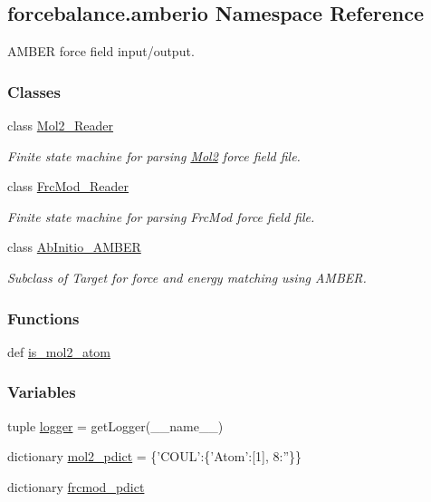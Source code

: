 \hypertarget{namespaceforcebalance_1_1amberio}{\subsection{forcebalance.\-amberio Namespace Reference}
\label{namespaceforcebalance_1_1amberio}
}


A\-M\-B\-E\-R force field input/output.  


\subsubsection*{Classes}
\begin{DoxyCompactItemize}
\item 
class \hyperlink{classforcebalance_1_1amberio_1_1Mol2__Reader}{Mol2\-\_\-\-Reader}
\begin{DoxyCompactList}\small\item\em Finite state machine for parsing \hyperlink{namespaceforcebalance_1_1Mol2}{Mol2} force field file. \end{DoxyCompactList}\item 
class \hyperlink{classforcebalance_1_1amberio_1_1FrcMod__Reader}{Frc\-Mod\-\_\-\-Reader}
\begin{DoxyCompactList}\small\item\em Finite state machine for parsing Frc\-Mod force field file. \end{DoxyCompactList}\item 
class \hyperlink{classforcebalance_1_1amberio_1_1AbInitio__AMBER}{Ab\-Initio\-\_\-\-A\-M\-B\-E\-R}
\begin{DoxyCompactList}\small\item\em Subclass of Target for force and energy matching using A\-M\-B\-E\-R. \end{DoxyCompactList}\end{DoxyCompactItemize}
\subsubsection*{Functions}
\begin{DoxyCompactItemize}
\item 
def \hyperlink{namespaceforcebalance_1_1amberio_af59589a24e815a11db69dcaa21c51659}{is\-\_\-mol2\-\_\-atom}
\end{DoxyCompactItemize}
\subsubsection*{Variables}
\begin{DoxyCompactItemize}
\item 
tuple \hyperlink{namespaceforcebalance_1_1amberio_a83e0daca87d51461c74be86337502ed5}{logger} = get\-Logger(\-\_\-\-\_\-name\-\_\-\-\_\-)
\item 
dictionary \hyperlink{namespaceforcebalance_1_1amberio_a84f51a0ccf50d3442cefb90f948653b0}{mol2\-\_\-pdict} = \{'C\-O\-U\-L'\-:\{'Atom'\-:\mbox{[}1\mbox{]}, 8\-:''\}\}
\item 
dictionary \hyperlink{namespaceforcebalance_1_1amberio_a7d8a1776c628e73cc2f4fb6eba17030a}{frcmod\-\_\-pdict}
\end{DoxyCompactItemize}



